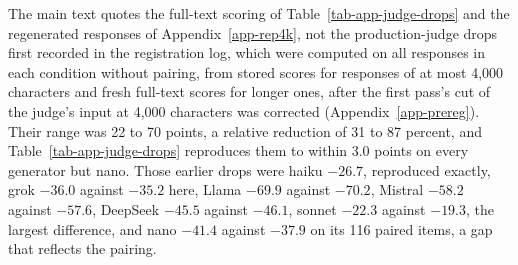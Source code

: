 The main text quotes the full-text scoring of Table~\ref{tab-app-judge-drops}
and the regenerated responses of Appendix~\ref{app-rep4k}, not the
production-judge drops first recorded in the registration log, which were
computed on all responses in each condition without pairing, from stored
scores for responses of at most 4,000 characters and fresh full-text scores
for longer ones, after the first pass's cut of the judge's input at 4,000
characters was corrected (Appendix~\ref{app-prereg}). Their range was 22 to
70 points, a relative reduction of 31 to 87 percent, and
Table~\ref{tab-app-judge-drops} reproduces them to within 3.0 points on every
generator but nano. Those earlier drops were haiku $-26.7$, reproduced
exactly, grok $-36.0$ against $-35.2$ here, Llama $-69.9$ against $-70.2$,
Mistral $-58.2$ against $-57.6$, DeepSeek $-45.5$ against $-46.1$, sonnet
$-22.3$ against $-19.3$, the largest difference, and nano $-41.4$ against
$-37.9$ on its 116 paired items, a gap that reflects the pairing.

